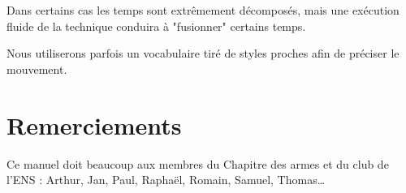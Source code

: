 Dans certains cas les temps sont extrêmement décomposés, mais une exécution fluide de la technique conduira à "fusionner" certains temps.

Nous utiliserons parfois un vocabulaire tiré de styles proches afin de préciser le mouvement.


\section{Remerciements}


Ce manuel doit beaucoup aux membres du Chapitre des armes et du club de l'ENS : Arthur, Jan, Paul, Raphaël, Romain, Samuel, Thomas…
